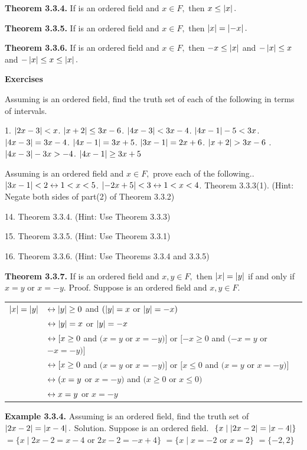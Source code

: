 \begin{large}
\textbf{Theorem 3.3.4.} If \of is an ordered field and $x\in F,$ then $x\leq \left|x\right|.$\nl

\textbf{Theorem 3.3.5.} If \of is an ordered field and $x\in F,$ then $\left|x\right|= \left|-x\right|.$\nl

\textbf{Theorem 3.3.6.} If \of  is an ordered field and $x \in F,$ then $-x \leq \left|x\right|$ and $-\left|x\right| \leq x$ and $-\left|x\right| \leq x \leq \left|x\right|.$\nl

\textbf{Exercises}\nl

Assuming  \of is an ordered field, find the truth set of each of the following in terms of intervals. \nl

1. $\left|2x - 3\right| < x $. $\left|x + 2\right| \leq 3x - 6 $. $\left|4x - 3\right| < 3x - 4 $. $\left|4x - 1\right| - 5 < 3x$. $\left|4x - 3\right| = 3x -4 $. $\left|4x - 1\right| = 3x + 5$. $\left|3x - 1\right| = 2x + 6$. $\left|x + 2\right| > 3x - 6$ . $\left|4x - 3\right| - 3x > -4$. $\left|4x - 1\right| \geq 3x + 5$\nl

Assuming \of is an ordered field and $x\in F,$ prove each of the following.. $\left|3x - 1\right| < 2 \leftrightarrow 1 < x < 5 $. $\left|-2x + 5\right| <3  \leftrightarrow  1 < x < 4$. Theorem 3.3.3(1). (Hint: Negate both sides of part(2) of Theorem 3.3.2) \nl

14. Theorem 3.3.4. (Hint: Use Theorem 3.3.3) \nl

15. Theorem 3.3.5. (Hint: Use Theorem 3.3.1) \nl

16. Theorem 3.3.6. (Hint: Use Theorems 3.3.4 and 3.3.5) \nl

\newpage
\textbf{Theorem 3.3.7.} If \of  is an ordered field and $x,y \in F,$ then $\left|x\right| = \left|y\right|$ if and only if $x = y$ or $x = -y.$\nl
 Proof. Suppose \of  is an ordered field and $x,y \in F.$ \nl
 \begin{tabular}{r l}
$\left|x\right| =\left|y\right|$ &$\leftrightarrow \left|y\right| \geq 0$ and $(\left|y\right| = x$ or $\left|y\right|= -x)$\\
&$\leftrightarrow \left|y\right| = x$ or $\left|y\right| = -x$\\
&$\leftrightarrow [x \geq 0$ and $(x = y$ or $x = -y)]$ or $[-x\geq 0$ and $(-x = y$ or $-x = -y)]$\\
&$\leftrightarrow [x \geq 0$ and $(x=y$ or $x=-y)]$ or $[x\leq 0$ and $(x=y$ or $x=-y)] $\\
&$\leftrightarrow (x=y$ or $x=-y)$ and $(x \geq 0$ or $x \leq 0)$\\
&$\leftrightarrow x = y$ or $x = -y$\\
\end{tabular}\nl

\textbf{Example 3.3.4.} Assuming \of is an ordered field, find the truth set of $\left|2x - 2\right| = \left|x - 4\right|.$\nl
Solution. Suppose \of is an ordered field. \nl
$ $ $\{x \mid \left|2x - 2\right| = \left|x - 4\right| \}$ \nl
$= \{x \mid 2x - 2 = x-4$ or $2x - 2= -x + 4 \}$\nl
$= \{x \mid x=-2$ or $x = 2\}$\nl
$=\{-2,2\}$\nl


\end{large}
